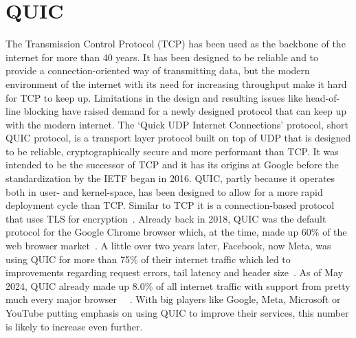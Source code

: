 \section{QUIC}\label{sec:quic_bg}
The Transmission Control Protocol (TCP) has been used as the backbone
of the internet for more than 40 years.
It has been designed to be reliable and to provide a connection-oriented
way of transmitting data, but the modern environment of the internet with
its need for increasing throughput make it hard for TCP to keep up.
Limitations in the design and resulting issues like head-of-line blocking
have raised demand for a newly designed protocol that can keep up with the
modern internet. %
The `Quick UDP Internet Connections' protocol, short QUIC protocol, is a 
transport layer protocol built on top of UDP that is designed to be reliable, 
cryptographically secure and more performant than TCP\@.
It was intended to be the successor of TCP and it has its origins at Google before 
the standardization by the IETF began in 2016.
QUIC, partly because it operates both in user- and kernel-space, has been designed to allow for a 
more rapid deployment cycle than TCP\@.
Similar to TCP it is a connection-based protocol that uses TLS for encryption~\parencite{quic-explained}.
Already back in 2018, QUIC was the default protocol for the Google Chrome browser which,
at the time, made up 60\% of the web browser market~\parencite{google-quic-usage}.
A little over two years later, Facebook, now Meta, was using QUIC for more than 75\% of 
their internet traffic which led to improvements regarding
request errors, tail latency and header size~\parencite{facebook-quic-usage}.
As of May 2024, QUIC already made up 8.0\% of all internet traffic
with support from pretty much every major browser
~\parencite{internet-quic-usage}~\parencite{article-quic-usage}.
With big players like Google, Meta, Microsoft or YouTube putting emphasis on
using QUIC to improve their services, this number is likely to increase even further.

